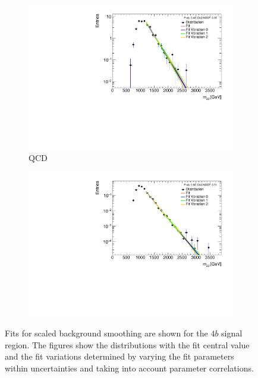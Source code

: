 \begin{figure}[htb!]
  \centering
  \captionsetup{justification=centering}
    \hspace{-2.5cm}
    \begin{subfigure}[b]{0.35\textwidth}
        \includegraphics[width=\textwidth,angle=-90]{figures/boosted/Smooth/qcd_est_FourTag_Signal_mHH_pole_l.pdf}
        \caption{QCD}
        \label{fig:signal-region-mjjscaled-smoothing-4b-qcd}
    \end{subfigure}
    \quad \quad \quad \quad \quad
    \begin{subfigure}[b]{0.35\textwidth}
        \includegraphics[width=\textwidth,angle=-90]{figures/boosted/Smooth/ttbar_est_FourTag_Signal_mHH_pole_l.pdf}
        \caption{\ttbar}
        \label{fig:signal-region-mjjscaled-smoothing-4b-ttbar}
    \end{subfigure}
    \caption{Fits for scaled background smoothing are shown for the $4b$ signal region. The figures show the distributions with the fit central value and the fit variations determined by varying the fit parameters within uncertainties and taking into account parameter correlations.}
  \label{fig:signal-region-mjjscaled-smoothing-4b}
\end{figure}

